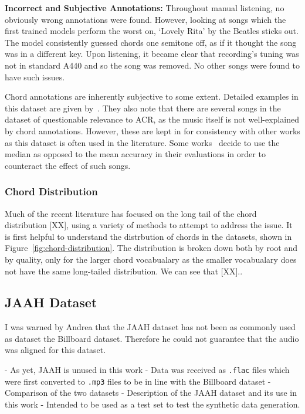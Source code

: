 \textbf{Incorrect and Subjective Annotations:} Throughout manual listening, no obviously wrong annotations were found. However, looking at songs which the first trained models perform the worst on, `Lovely Rita' by the Beatles sticks out. The model consistently guessed chords one semitone off, as if it thought the song was in a different key. Upon listening, it became clear that recording's tuning was not in standard A440 and so the song was removed. No other songs were found to have such issues.

Chord annotations are inherently subjective to some extent. Detailed examples in this dataset are given by~\citet{FourTimelyInsights}. They also note that there are several songs in the dataset of questionable relevance to ACR, as the music itself is not well-explained by chord annotations. However, these are kept in for consistency with other works as this dataset is often used in the literature. Some works~\citep{StructuredTraining} decide to use the median as opposed to the mean accuracy in their evaluations in order to counteract the effect of such songs.

\subsubsection{Chord Distribution}

Much of the recent literature has focused on the long tail of the chord distribution [XX], using a variety of methods to attempt to address the issue. It is first helpful to understand the distrbution of chords in the datasets, shown in Figure~\ref{fig:chord-distribution}. The distribution is broken down both by root and by quality, only for the larger chord vocabualary as the smaller vocabualary does not have the same long-tailed distribution. We can see that [XX]..


\subsection{JAAH Dataset}
I was warned by Andrea that the JAAH dataset has not been as commonly used as dataset the Billboard dataset. Therefore he could not guarantee that the audio was aligned for this dataset.

- As yet, JAAH is unused in this work
- Data was received as \texttt{.flac} files which were first converted to \texttt{.mp3} files to be in line with the Billboard dataset
- Comparison of the two datasets
- Description of the JAAH dataset and its use in this work
- Intended to be used as a test set to test the synthetic data generation.

